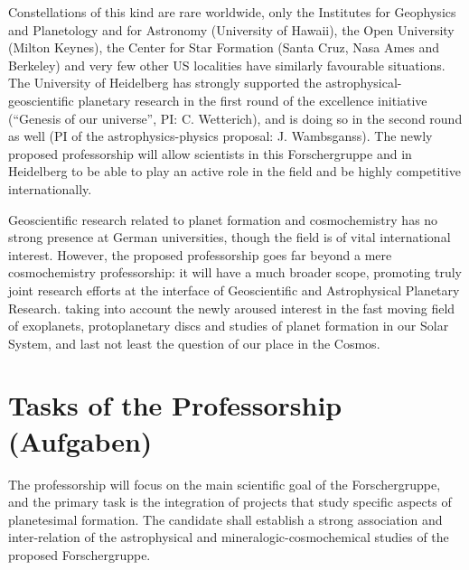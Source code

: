 Constellations of
this kind are rare worldwide, only the Institutes for Geophysics and
Planetology and for Astronomy (University of Hawaii),
the Open University (Milton Keynes), the Center for Star Formation
(Santa Cruz, Nasa Ames and Berkeley) and very few other US localities
have similarly favourable situations. The University of Heidelberg has strongly
supported the astrophysical-geoscientific planetary research in the first
round of the excellence initiative (``Genesis of our universe'',
PI: C. Wetterich), and is doing so in the second round as well
(PI of the astrophysics-physics proposal: J. Wambsganss). 
The newly proposed professorship will allow scientists in this Forschergruppe and
in Heidelberg to be able to play an active role in the field and be
highly competitive internationally.

Geoscientific research related to planet formation and cosmochemistry has no
strong presence at German universities, though the field is of vital international
interest. 
However, the proposed professorship goes far beyond a mere cosmochemistry
professorship: it will have a much broader scope, promoting truly joint research
efforts at the interface of Geoscientific and Astrophysical Planetary Research.
taking into account the newly aroused interest in the fast moving field of
exoplanets, protoplanetary discs and studies of planet formation in our Solar
System, and last not least the question of our place in the Cosmos.

%
\section{Tasks of the Professorship (Aufgaben)}
%
The professorship will focus on the main scientific goal of the Forschergruppe, and
the primary task is the integration of projects that study specific aspects of
planetesimal formation. The candidate shall establish a strong association and
inter-relation of the astrophysical and mineralogic-cosmochemical studies of the
proposed Forschergruppe.

